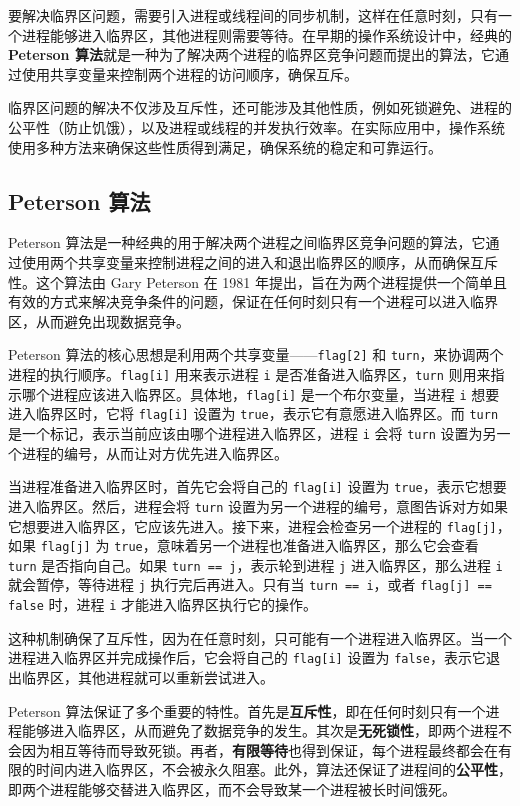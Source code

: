 要解决临界区问题，需要引入进程或线程间的同步机制，这样在任意时刻，只有一个进程能够进入临界区，其他进程则需要等待。在早期的操作系统设计中，经典的 \textbf{Peterson 算法}就是一种为了解决两个进程的临界区竞争问题而提出的算法，它通过使用共享变量来控制两个进程的访问顺序，确保互斥。

临界区问题的解决不仅涉及互斥性，还可能涉及其他性质，例如死锁避免、进程的公平性（防止饥饿），以及进程或线程的并发执行效率。在实际应用中，操作系统使用多种方法来确保这些性质得到满足，确保系统的稳定和可靠运行。

\subsection{Peterson 算法}

Peterson 算法是一种经典的用于解决两个进程之间临界区竞争问题的算法，它通过使用两个共享变量来控制进程之间的进入和退出临界区的顺序，从而确保互斥性。这个算法由 Gary Peterson 在 1981 年提出，旨在为两个进程提供一个简单且有效的方式来解决竞争条件的问题，保证在任何时刻只有一个进程可以进入临界区，从而避免出现数据竞争。

Peterson 算法的核心思想是利用两个共享变量——\texttt{flag[2]} 和 \texttt{turn}，来协调两个进程的执行顺序。\texttt{flag[i]} 用来表示进程 \texttt{i} 是否准备进入临界区，\texttt{turn} 则用来指示哪个进程应该进入临界区。具体地，\texttt{flag[i]} 是一个布尔变量，当进程 \texttt{i} 想要进入临界区时，它将 \texttt{flag[i]} 设置为 \texttt{true}，表示它有意愿进入临界区。而 \texttt{turn} 是一个标记，表示当前应该由哪个进程进入临界区，进程 \texttt{i} 会将 \texttt{turn} 设置为另一个进程的编号，从而让对方优先进入临界区。

当进程准备进入临界区时，首先它会将自己的 \texttt{flag[i]} 设置为 \texttt{true}，表示它想要进入临界区。然后，进程会将 \texttt{turn} 设置为另一个进程的编号，意图告诉对方如果它想要进入临界区，它应该先进入。接下来，进程会检查另一个进程的 \texttt{flag[j]}，如果 \texttt{flag[j]} 为 \texttt{true}，意味着另一个进程也准备进入临界区，那么它会查看 \texttt{turn} 是否指向自己。如果 \texttt{turn == j}，表示轮到进程 \texttt{j} 进入临界区，那么进程 \texttt{i} 就会暂停，等待进程 \texttt{j} 执行完后再进入。只有当 \texttt{turn == i}，或者 \texttt{flag[j] == false} 时，进程 \texttt{i} 才能进入临界区执行它的操作。

这种机制确保了互斥性，因为在任意时刻，只可能有一个进程进入临界区。当一个进程进入临界区并完成操作后，它会将自己的 \texttt{flag[i]} 设置为 \texttt{false}，表示它退出临界区，其他进程就可以重新尝试进入。

Peterson 算法保证了多个重要的特性。首先是\textbf{互斥性}，即在任何时刻只有一个进程能够进入临界区，从而避免了数据竞争的发生。其次是\textbf{无死锁性}，即两个进程不会因为相互等待而导致死锁。再者，\textbf{有限等待}也得到保证，每个进程最终都会在有限的时间内进入临界区，不会被永久阻塞。此外，算法还保证了进程间的\textbf{公平性}，即两个进程能够交替进入临界区，而不会导致某一个进程被长时间饿死。

